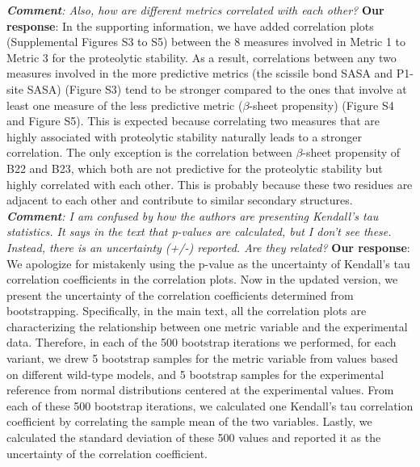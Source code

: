 \documentclass[sn-vancouver]{sn-jnl}
\begin{document}
\newline
\newline
\indent
\textit{\textbf{Comment}: Also, how are different metrics correlated with each other?}
\newline
\indent 
{\bf Our response}: 
In the supporting information, we have added correlation plots (Supplemental Figures S3 to S5) between the 8 measures involved in Metric 1 to Metric 3 for the proteolytic stability. As a result, correlations between any two measures involved in the more predictive metrics (the scissile bond SASA and P1-site SASA) (Figure S3) tend to be stronger compared to the ones that involve at least one measure of the less predictive metric ($\beta$-sheet propensity) (Figure S4 and Figure S5). This is expected because correlating two measures that are highly associated with proteolytic stability naturally leads to a stronger correlation. The only exception is the correlation between $\beta$-sheet propensity of B22 and B23, which both are not predictive for the proteolytic stability but highly correlated with each other. This is probably because these two residues are adjacent to each other and contribute to similar secondary structures. 
\newline
\newline
\indent
\textit{\textbf{Comment}:
I am confused by how the authors are presenting Kendall's tau statistics. It says in the text that p-values are calculated, but I don't see these.  Instead, there is an uncertainty (+/-) reported.  Are they related?}
\newline
\indent 
{\bf Our response}: 
We apologize for mistakenly using the p-value as the uncertainty of Kendall's tau correlation coefficients in the correlation plots. Now in the updated version, we present the uncertainty of the correlation coefficients determined from bootstrapping. 
\newline
\indent
Specifically, in the main text, all the correlation plots are characterizing the relationship between one metric variable and the experimental data. Therefore, in each of the 500 bootstrap iterations we performed, for each variant, we drew 5 bootstrap samples for the metric variable from values based on different wild-type models, and 5 bootstrap samples for the experimental reference from normal distributions centered at the experimental values. From each of these 500 bootstrap iterations, we calculated one Kendall's tau correlation coefficient by correlating the sample mean of the two variables. Lastly, we calculated the standard deviation of these 500 values and reported it as the uncertainty of the correlation coefficient. 
\end{document}
